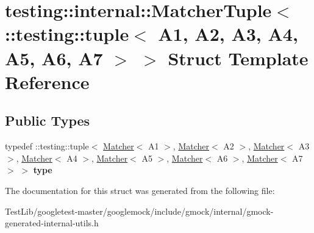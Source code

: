\hypertarget{structtesting_1_1internal_1_1MatcherTuple_3_01_1_1testing_1_1tuple_3_01A1_00_01A2_00_01A3_00_01A63c742e825c64dbe2671b0a407b3db47}{}\section{testing\+:\+:internal\+:\+:Matcher\+Tuple$<$ \+:\+:testing\+:\+:tuple$<$ A1, A2, A3, A4, A5, A6, A7 $>$ $>$ Struct Template Reference}
\label{structtesting_1_1internal_1_1MatcherTuple_3_01_1_1testing_1_1tuple_3_01A1_00_01A2_00_01A3_00_01A63c742e825c64dbe2671b0a407b3db47}
\subsection*{Public Types}
\begin{DoxyCompactItemize}
\item 
\mbox{\label{structtesting_1_1internal_1_1MatcherTuple_3_01_1_1testing_1_1tuple_3_01A1_00_01A2_00_01A3_00_01A63c742e825c64dbe2671b0a407b3db47_a733b8ef9996b7f465e9018393bec5cc4}} 
typedef \+::testing\+::tuple$<$ \hyperlink{classtesting_1_1Matcher}{Matcher}$<$ A1 $>$, \hyperlink{classtesting_1_1Matcher}{Matcher}$<$ A2 $>$, \hyperlink{classtesting_1_1Matcher}{Matcher}$<$ A3 $>$, \hyperlink{classtesting_1_1Matcher}{Matcher}$<$ A4 $>$, \hyperlink{classtesting_1_1Matcher}{Matcher}$<$ A5 $>$, \hyperlink{classtesting_1_1Matcher}{Matcher}$<$ A6 $>$, \hyperlink{classtesting_1_1Matcher}{Matcher}$<$ A7 $>$ $>$ {\bfseries type}
\end{DoxyCompactItemize}


The documentation for this struct was generated from the following file\+:\begin{DoxyCompactItemize}
\item 
Test\+Lib/googletest-\/master/googlemock/include/gmock/internal/gmock-\/generated-\/internal-\/utils.\+h\end{DoxyCompactItemize}

